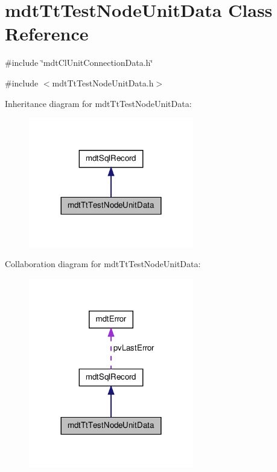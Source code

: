 \hypertarget{classmdt_tt_test_node_unit_data}{\section{mdt\-Tt\-Test\-Node\-Unit\-Data Class Reference}
\label{classmdt_tt_test_node_unit_data}
}


\#include \char`\"{}mdt\-Cl\-Unit\-Connection\-Data.\-h\char`\"{}  




{\ttfamily \#include $<$mdt\-Tt\-Test\-Node\-Unit\-Data.\-h$>$}



Inheritance diagram for mdt\-Tt\-Test\-Node\-Unit\-Data\-:\nopagebreak
\begin{figure}[H]
\begin{center}
\leavevmode
\includegraphics[width=204pt]{classmdt_tt_test_node_unit_data__inherit__graph}
\end{center}
\end{figure}


Collaboration diagram for mdt\-Tt\-Test\-Node\-Unit\-Data\-:\nopagebreak
\begin{figure}[H]
\begin{center}
\leavevmode
\includegraphics[width=204pt]{classmdt_tt_test_node_unit_data__coll__graph}
\end{center}
\end{figure}
